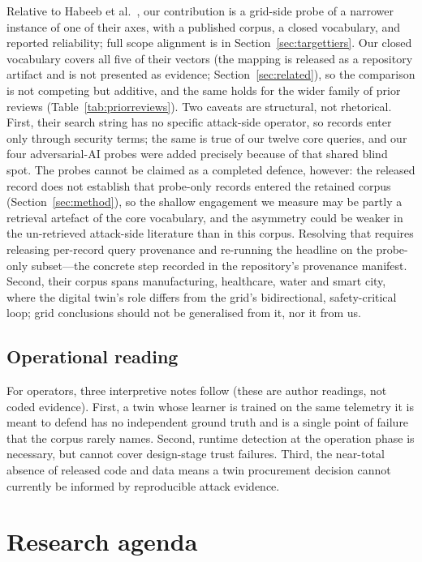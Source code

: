 \documentclass[preprint,12pt]{elsarticle}
\renewcommand{\_}{\plainunderscore\allowbreak}
\begin{document}
Relative to Habeeb et al.\ \cite{habeeb2026}, our contribution is a grid-side probe of a
narrower instance of one of their axes, with a published corpus, a closed vocabulary, and
reported reliability; full scope alignment is in Section~\ref{sec:targettiers}. Our
closed vocabulary covers all five of their vectors (the mapping is released as a
repository artifact and is not presented as evidence; Section~\ref{sec:related}), so the
comparison is not competing but additive, and the same holds for the wider family of
prior reviews (Table~\ref{tab:priorreviews}). Two caveats are structural, not rhetorical. First,
their search string has no specific attack-side operator, so records enter only through
security terms; the same is true of our twelve core queries, and our four adversarial-AI
probes were added precisely because of that shared blind spot. The probes cannot be
claimed as a completed defence, however: the released record does not establish that
probe-only records entered the retained corpus (Section~\ref{sec:method}), so the shallow
engagement we measure may be partly a retrieval artefact of the core vocabulary, and the
asymmetry could be weaker in the un-retrieved attack-side literature than in this corpus.
Resolving that requires releasing per-record query provenance and re-running the headline on
the probe-only subset---the concrete step recorded in the repository's provenance manifest.
Second, their corpus spans manufacturing, healthcare, water and smart city, where
the digital twin's role differs from the grid's bidirectional, safety-critical loop; grid
conclusions should not be generalised from it, nor it from us.

\subsection{Operational reading}

For operators, three interpretive notes follow (these are author readings, not coded evidence).
First, a twin whose learner is trained on the same telemetry it is meant to defend has no
independent ground truth and is a single point of failure that the corpus rarely names.
Second, runtime detection at the operation phase is necessary, but cannot cover design-stage
trust failures. Third, the near-total absence of released code and data means a twin
procurement decision cannot currently be informed by reproducible attack evidence.

\section{Research agenda}\label{sec:agenda}
\end{document}
